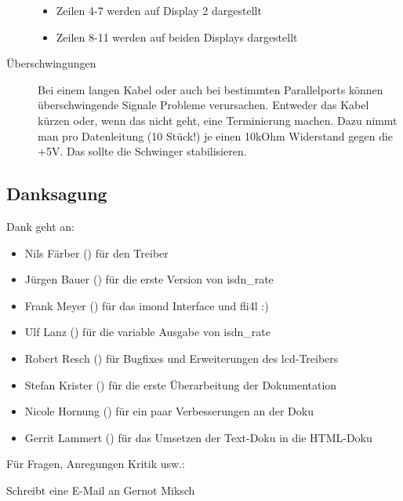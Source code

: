 \begin{description}
\begin{itemize}
  \item  Zeilen 4-7 werden auf Display 2 dargestellt
    
  \item Zeilen 8-11 werden auf beiden Displays dargestellt
  \end{itemize}


 \item [Überschwingungen]

  Bei einem langen Kabel oder auch bei bestimmten Parallelports können
  überschwingende Signale Probleme verursachen. Entweder
  das Kabel kürzen oder, wenn das nicht geht, eine Terminierung machen. Dazu
  nimmt man pro Datenleitung (10 Stück!) je einen 10kOhm Widerstand gegen die
  +5V. Das sollte die Schwinger stabilisieren.

\end{description}


\subsection{Danksagung}

  Dank geht an:

  \begin{itemize}
  \item Nils Färber () für den Treiber
   
  \item Jürgen Bauer () für die erste Version von isdn\_rate
   
  \item Frank Meyer () für das imond Interface und fli4l :)
   
  \item Ulf Lanz () für die variable Ausgabe von isdn\_rate
   
  \item Robert Resch () für Bugfixes und Erweiterungen des
     lcd-Treibers
   
  \item Stefan Krister () für die erste
     Überarbeitung der Dokumentation
   
   \item Nicole Hornung () für ein paar Verbesserungen
     an der Doku
   
   \item Gerrit Lammert () für das Umsetzen der Text-Doku
     in die HTML-Doku
  \end{itemize}


    Für Fragen, Anregungen Kritik usw.:

    Schreibt eine \mbox{E-Mail} an Gernot Miksch 


